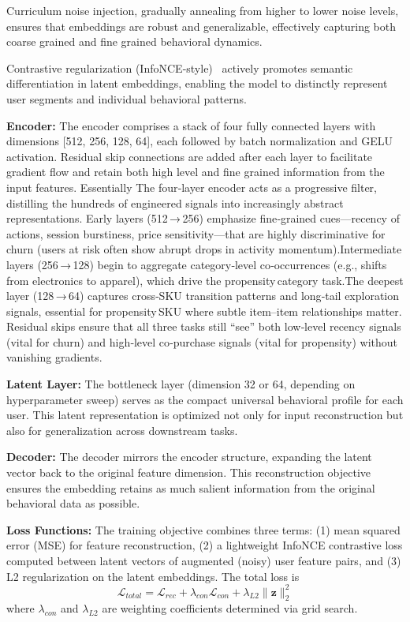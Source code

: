 \documentclass[sigconf]{acmart}
\begin{document}
Curriculum noise injection, gradually annealing from higher to lower noise levels, ensures that embeddings are robust and generalizable, effectively capturing both coarse grained and fine grained behavioral dynamics.

Contrastive regularization (InfoNCE-style)~\cite{Oord2018} actively promotes semantic differentiation in latent embeddings, enabling the model to distinctly represent user segments and individual behavioral patterns.

\textbf{Encoder:}  
The encoder comprises a stack of four fully connected layers with dimensions [512, 256, 128, 64], each followed by batch normalization and GELU activation. Residual skip connections are added after each layer to facilitate gradient flow and retain both high level and fine grained information from the input features. Essentially The four‐layer encoder acts as a progressive filter, distilling the hundreds of engineered signals into increasingly abstract representations.
Early layers (512 → 256) emphasize fine‑grained cues—recency of actions, session burstiness, price sensitivity—that are highly discriminative for churn (users at risk often show abrupt drops in activity momentum).Intermediate layers (256 → 128) begin to aggregate category‑level co‑occurrences (e.g., shifts from electronics to apparel), which drive the propensity category task.The deepest layer (128 → 64) captures cross‑SKU transition patterns and long‑tail exploration signals, essential for propensity SKU where subtle item–item relationships matter.
Residual skips ensure that all three tasks still “see” both low‑level recency signals (vital for churn) and high‑level co‑purchase signals (vital for propensity) without vanishing gradients.

\textbf{Latent Layer:}  
The bottleneck layer (dimension 32 or 64, depending on hyperparameter sweep) serves as the compact universal behavioral profile for each user. This latent representation is optimized not only for input reconstruction but also for generalization across downstream tasks.

\textbf{Decoder:}  
The decoder mirrors the encoder structure, expanding the latent vector back to the original feature dimension. This reconstruction objective ensures the embedding retains as much salient information from the original behavioral data as possible.

\textbf{Loss Functions:}  
The training objective combines three terms: (1) mean squared error (MSE) for feature reconstruction, (2) a lightweight InfoNCE contrastive loss computed between latent vectors of augmented (noisy) user feature pairs, and (3) L2 regularization on the latent embeddings. The total loss is  
\[
\mathcal{L}_{total} = \mathcal{L}_{rec} + \lambda_{con}\mathcal{L}_{con} + \lambda_{L2}\|\mathbf{z}\|_2^2
\]  
where $\lambda_{con}$ and $\lambda_{L2}$ are weighting coefficients determined via grid search.
\end{document}
